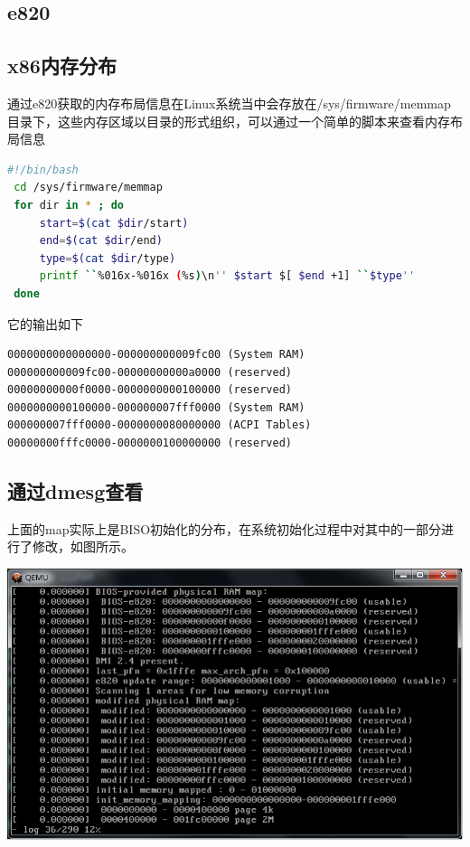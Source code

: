 \documentclass[b5paper,9pt,twoside,openany]{article}
\begin{document}
\subsection{e820}
\subsection{x86内存分布}
通过e820获取的内存布局信息在Linux系统当中会存放在/sys/firmware/memmap目录下，这些内存区域以目录的形式组织，可以通过一个简单的脚本来查看内存布局信息
\begin{lstlisting}[language=bash]
#!/bin/bash
 cd /sys/firmware/memmap
 for dir in * ; do
     start=$(cat $dir/start)
     end=$(cat $dir/end)
     type=$(cat $dir/type)
     printf ``%016x-%016x (%s)\n'' $start $[ $end +1] ``$type''
 done
\end{lstlisting}
它的输出如下
\begin{lstlisting}
0000000000000000-000000000009fc00 (System RAM)
000000000009fc00-00000000000a0000 (reserved)
00000000000f0000-0000000000100000 (reserved)
0000000000100000-000000007fff0000 (System RAM)
000000007fff0000-0000000080000000 (ACPI Tables)
00000000fffc0000-0000000100000000 (reserved)
\end{lstlisting}
\subsection{通过dmesg查看}
上面的map实际上是BISO初始化的分布，在系统初始化过程中对其中的一部分进行了修改，如图所示。

\includegraphics[scale=0.25]{images/e820}
\end{document}
